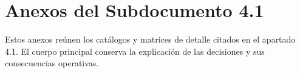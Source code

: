
\portadalafrox
\indicelafrox
\setcounter{chapter}{4}
\renewcommand{\thetable}{A.\arabic{table}}
\chapter*{Anexos del Subdocumento 4.1}
Estos anexos reúnen los catálogos y matrices de detalle citados en el apartado 4.1. El cuerpo principal conserva la explicación de las decisiones y sus consecuencias operativas.


